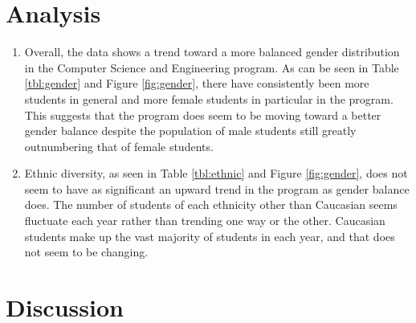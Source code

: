 \documentclass[letterpaper]{article}
\begin{document}
\pagebreak



\vfill



\section*{Analysis}

\begin{enumerate}

\item{Overall, the data shows a trend toward a more balanced gender
distribution in the Computer Science and Engineering program.  As can 
be seen in Table \ref{tbl:gender} and Figure \ref{fig:gender}, there
have consistently been more students in general and more female
students in particular in the program.  This suggests that the program 
does seem to be moving toward a better gender balance despite the 
population of male students still greatly outnumbering that of female
students.}

\item{Ethnic diversity, as seen in Table \ref{tbl:ethnic} and Figure
\ref{fig:gender}, does not seem to have as significant an upward trend in the program as gender balance does.  The number of students of each ethnicity other than Caucasian seems fluctuate each year rather than trending one way or the other.  Caucasian students make up the vast majority of students in each year, and that does not seem to be changing.}

\end{enumerate}





\section*{Discussion}

\paragraph{}
\end{document}
